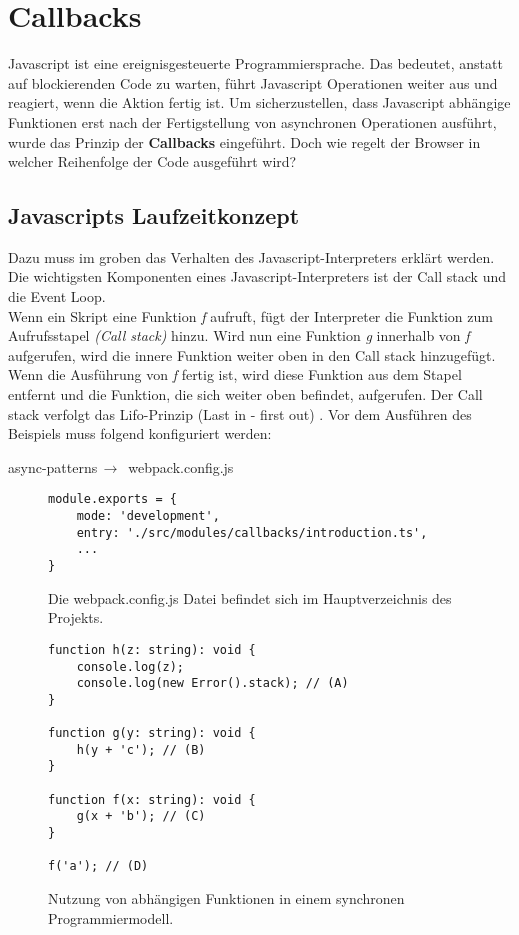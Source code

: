 \section{Callbacks}
Javascript ist eine ereignisgesteuerte Programmiersprache. Das bedeutet, anstatt auf blockierenden Code zu warten, führt Javascript Operationen weiter aus und reagiert, wenn die Aktion fertig ist. Um sicherzustellen, dass Javascript abhängige Funktionen erst nach der Fertigstellung von asynchronen Operationen ausführt, wurde das Prinzip der \textbf{Callbacks} eingeführt. Doch wie regelt der Browser in welcher Reihenfolge der Code ausgeführt wird?

\subsection{Javascripts Laufzeitkonzept}
Dazu muss im groben das Verhalten des Javascript-Interpreters erklärt werden. Die wichtigsten Komponenten eines Javascript-Interpreters ist der Call stack und die Event Loop.\\

\noindent
Wenn ein Skript eine Funktion \textit{f} aufruft, fügt der Interpreter die Funktion zum Aufrufsstapel \textit{(Call stack)} hinzu. Wird nun eine Funktion \textit{g} innerhalb von \textit{f} aufgerufen, wird die innere Funktion weiter oben in den Call stack hinzugefügt. Wenn die Ausführung von \textit{f} fertig ist, wird diese Funktion aus dem Stapel entfernt und die Funktion, die sich weiter oben befindet, aufgerufen. Der Call stack verfolgt das Lifo-Prinzip (Last in - first out) \cite{javascript-interpreter}. Vor dem Ausführen des Beispiels muss folgend konfiguriert werden:

\begin{center}
    async-patterns$\,\to\,$ webpack.config.js
\end{center}

\begin{figure}[H]
\begin{lstlisting}[basicstyle=\small]
module.exports = {
    mode: 'development',
    entry: './src/modules/callbacks/introduction.ts',
    ...
}
\end{lstlisting}
\caption{Die webpack.config.js Datei befindet sich im Hauptverzeichnis des Projekts.}
\end{figure}

\begin{figure}[H]
\begin{lstlisting}[basicstyle=\small]
function h(z: string): void {
    console.log(z);
    console.log(new Error().stack); // (A)
}

function g(y: string): void {
    h(y + 'c'); // (B)
}

function f(x: string): void {
    g(x + 'b'); // (C)
}

f('a'); // (D)
\end{lstlisting}
\caption{Nutzung von abhängigen Funktionen in einem synchronen Programmiermodell.}
\end{figure}

